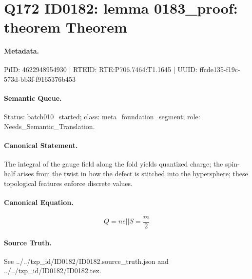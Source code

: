 \section*{Q172 ID0182: lemma 0183\_proof: theorem Theorem}
\paragraph{Metadata.}
PiID: 4622948954930 | RTEID: RTE:P706.7464:T1.1645 | UUID: ffcde135-f19c-573d-bb3f-f9165376b453

\paragraph{Semantic Queue.}
Status: batch010\_started; class: meta\_foundation\_segment; role: Needs\_Semantic\_Translation.

\paragraph{Canonical Statement.}
The integral of the gauge field along the fold yields quantized charge; the spin-half arises from the twist in how the defect is stitched into the hypersphere; these topological features enforce discrete values.

\paragraph{Canonical Equation.}
\[
Q = n e || S = \frac{m}{2}
\]

\paragraph{Source Truth.}
See ../../tzp\_id/ID0182/ID0182.source\_truth.json and ../../tzp\_id/ID0182/ID0182.tex.
